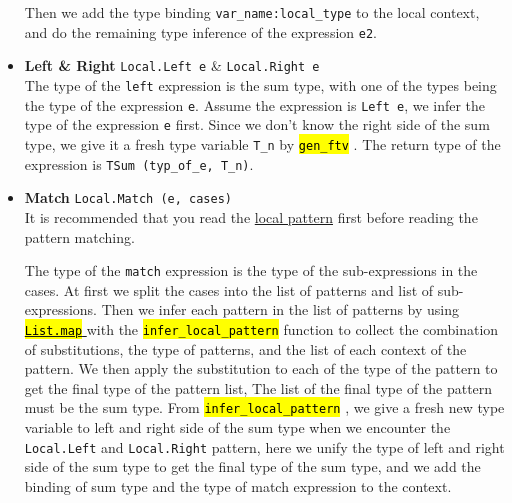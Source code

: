 \documentclass{article}
\newcommand{\highlighttexttt}[2][black]{ %
  \sethlcolor{cyan!10} %
  \texttt{\textcolor{#1}{\hl{#2}}}
}
\begin{document}
\begin{itemize}
                  Then we add the type binding \texttt{var\_name:local\_type} to the local context, and do the remaining type inference of the expression \texttt{e2}.
            \item \textbf{Left \& Right} \texttt{Local.Left e} \& \texttt{Local.Right e}\\
                  The type of the \texttt{left} expression is the sum type, with one of the types being the type of the expression \texttt{e}.
                  Assume the expression is \texttt{Left e}, we infer the type of the expression \texttt{e} first.
                  Since we don't know the right side of the sum type, we give it a fresh type variable \texttt{T\_n} by \highlighttexttt{gen\_ftv}.
                  The return type of the expression is \texttt{TSum (typ\_of\_e, T\_n)}.
            \item \textbf{Match} \texttt{Local.Match (e, cases)}\\
                  It is recommended that you read the \hyperref[local_pattern]{local pattern} first before reading the pattern matching.

                  The type of the \texttt{match} expression is the type of the sub-expressions in the cases. At first we
                  split the cases into the list of patterns and list of sub-expressions. Then we infer each pattern in the list of patterns
                  by using \href{https://ocaml.org/manual/5.2/api/List.html#VALmap}{\highlighttexttt[orange]{List.map}} with the \highlighttexttt{infer\_local\_pattern} function to collect the combination of substitutions,
                  the type of patterns, and the list of each context of the pattern. We then apply the substitution to each of the type of the pattern
                  to get the final type of the pattern list, The list of the final type of the pattern must be the sum type. From \highlighttexttt{infer\_local\_pattern},
                  we give a fresh new type variable to left and right side of the sum type when we encounter the \texttt{Local.Left} and \texttt{Local.Right} pattern,
                  here we unify the type of left and right side of the sum type to get the final type of the sum type,
                  and we add the binding of sum type and the type of match expression to the context.


\end{itemize}
\end{document}
